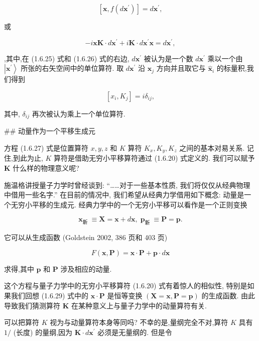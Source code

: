 \documentclass[lang=cn,newtx,10pt,scheme=chinese,thmcnt=section]{elegantbook}
\begin{document}
$$
\left\lbrack {\mathbf{x}, f\left( {d{\mathbf{x}}^{\prime }}\right) }\right\rbrack = d{\mathbf{x}}^{\prime }, \tag{1.6.25}
$$

或

$$
- i\mathbf{x}\mathbf{K} \cdot d{\mathbf{x}}^{\prime } + i\mathbf{K} \cdot d{\mathbf{x}}^{\prime }\mathbf{x} = d{\mathbf{x}}^{\prime }, \tag{1.6.26}
$$

,其中,在 (1.6.25) 式和 (1.6.26) 式的右边, $d{\mathbf{x}}^{\prime }$ 被认为是一个数 $d{\mathbf{x}}^{\prime }$ 乘以一个由 $\left| {\mathbf{x}}^{\prime }\right\rangle$ 所张的右矢空间中的单位算符. 取 $d{\mathbf{x}}^{\prime }$ 沿 ${\widehat{\mathbf{x}}}_{j}$ 方向并且取它与 ${\widehat{\mathbf{x}}}_{i}$ 的标量积,我们得到

$$
\left\lbrack {{x}_{i},{K}_{j}}\right\rbrack = i{\delta }_{ij}, \tag{1.6.27}
$$

其中, ${\delta }_{ij}$ 再次被认为乘上一个单位算符.

## 动量作为一个平移生成元

方程 (1.6.27) 式是位置算符 $x, y, z$ 和 $K$ 算符 ${K}_{x},{K}_{y},{K}_{z}$ 之间的基本对易关系. 记住,到此为止, $K$ 算符是借助无穷小平移算符通过 (1.6.20) 式定义的. 我们可以赋予 $\mathbf{K}$ 什么样的物理意义呢?

施温格讲授量子力学时曾经谈到: “……对于一些基本性质, 我们将仅仅从经典物理中借用一些名字.” 在目前的情况中, 我们希望从经典力学借用如下概念: 动量是一个无穷小平移的生成元. 经典力学中的一个无穷小平移可以看作是一个正则变换

$$
{\mathbf{x}}_{\text{新 }} \equiv \mathbf{X} = \mathbf{x} + d\mathbf{x},\;{\mathbf{p}}_{\text{新 }} \equiv \mathbf{P} = \mathbf{p}. \tag{1.6.28}
$$

它可以从生成函数 (Goldstein 2002, 386 页和 403 页)

$$
F\left( {\mathbf{x},\mathbf{P}}\right) = \mathbf{x} \cdot \mathbf{P} + \mathbf{p} \cdot d\mathbf{x} \tag{1.6.29}
$$

求得,其中 $\mathbf{p}$ 和 $\mathbf{P}$ 涉及相应的动量.

这个方程与量子力学中的无穷小平移算符 (1.6.20) 式有着惊人的相似性, 特别是如果我们回想 (1.6.29) 式中的 $\mathbf{x} \cdot \mathbf{P}$ 是恒等变换 $\left( {\mathbf{X} = \mathbf{x},\mathbf{P} = \mathbf{p}}\right)$ 的生成函数. 由此导致我们猜测算符 $\mathbf{K}$ 在某种意义上与量子力学中的动量算符有关.

可以把算符 $K$ 视为与动量算符本身等同吗? 不幸的是,量纲完全不对,算符 $K$ 具有 $1/$ (长度) 的量纲,因为 $\mathbf{K} \cdot d{\mathbf{x}}^{\prime }$ 必须是无量纲的. 但是令
\end{document}
